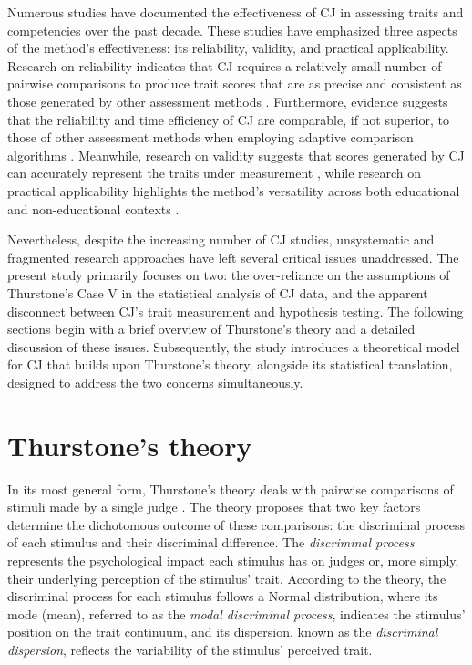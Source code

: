 \documentclass[
  authoryear,
  preprint,
  1p]{elsarticle}
\begin{document}
Numerous studies have documented the effectiveness of CJ in assessing
traits and competencies over the past decade. These studies have
emphasized three aspects of the method's effectiveness: its reliability,
validity, and practical applicability. Research on reliability indicates
that CJ requires a relatively small number of pairwise comparisons
\citep{Verhavert_et_al_2019, Crompvoets_et_al_2022} to produce trait
scores that are as precise and consistent as those generated by other
assessment methods
\citep{Coertjens_et_al_2017, Goossens_et_al_2018, Bouwer_et_al_2023}.
Furthermore, evidence suggests that the reliability and time efficiency
of CJ are comparable, if not superior, to those of other assessment
methods when employing adaptive comparison algorithms
\citep{Pollitt_2012b, Verhavert_et_al_2022, Mikhailiuk_et_al_2021}.
Meanwhile, research on validity suggests that scores generated by CJ can
accurately represent the traits under measurement
\citep{Whitehouse_2012, vanDaal_et_al_2016, Lesterhuis_2018_thesis, Bartholomew_et_al_2018, Bouwer_et_al_2023},
while research on practical applicability highlights the method's
versatility across both educational and non-educational contexts
\citep{Kimbell_2012, Jones_et_al_2015, Bartholomew_et_al_2018, Jones_et_al_2019, Marshall_et_al_2020, Bartholomew_et_al_2020, Boonen_et_al_2020}.

Nevertheless, despite the increasing number of CJ studies, unsystematic
and fragmented research approaches have left several critical issues
unaddressed. The present study primarily focuses on two: the
over-reliance on the assumptions of Thurstone's Case V in the
statistical analysis of CJ data, and the apparent disconnect between
CJ's trait measurement and hypothesis testing. The following sections
begin with a brief overview of Thurstone's theory and a detailed
discussion of these issues. Subsequently, the study introduces a
theoretical model for CJ that builds upon Thurstone's theory, alongside
its statistical translation, designed to address the two concerns
simultaneously.

\section{Thurstone's theory}\label{sec-thurstone_theory}

In its most general form, Thurstone's theory deals with pairwise
comparisons of stimuli made by a single judge
\citep[pp.~267]{Thurstone_1927b}. The theory proposes that two key
factors determine the dichotomous outcome of these comparisons: the
discriminal process of each stimulus and their discriminal difference.
The \emph{discriminal process} represents the psychological impact each
stimulus has on judges or, more simply, their underlying perception of
the stimulus' trait. According to the theory, the discriminal process
for each stimulus follows a Normal distribution, where its mode (mean),
referred to as the \emph{modal discriminal process}, indicates the
stimulus' position on the trait continuum, and its dispersion, known as
the \emph{discriminal dispersion}, reflects the variability of the
stimulus' perceived trait.
\end{document}

